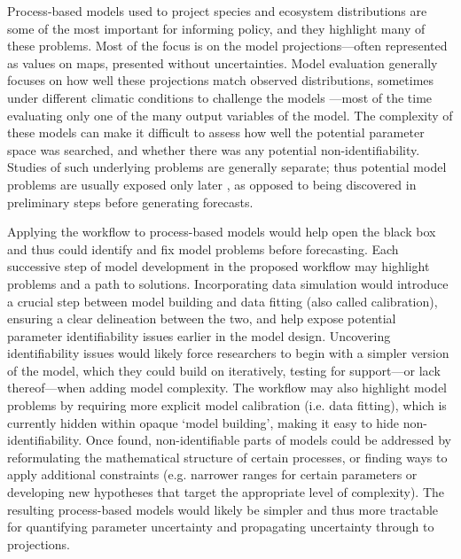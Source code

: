 \documentclass[11pt]{article}
\begin{document}
Process-based models used to project species and ecosystem distributions are some of the most important for informing policy, and they highlight many of these problems. Most of the focus is on the model projections---often represented as values on maps, presented without uncertainties. Model evaluation generally focuses on how well these projections match observed distributions, sometimes under different climatic conditions to challenge the models \citep{VanderMeersch2025a}---most of the time evaluating only one of the many output variables of the model.
The complexity of these models can make it difficult to assess how well the potential parameter space was searched, and whether there was any potential non-identifiability. Studies of such underlying problems are generally separate; thus potential model problems are usually exposed only later \citep{VanderMeersch2025b}, as opposed to being discovered in preliminary steps before generating forecasts. 

Applying the workflow to process-based models would help open the black box and thus could identify and fix model problems before forecasting.
Each successive step of model development in the proposed workflow may highlight problems and a path to solutions. Incorporating data simulation would introduce a crucial step between model building and data fitting (also called calibration), ensuring a clear delineation between the two, and help expose potential parameter identifiability issues earlier in the model design. 
Uncovering identifiability issues would likely force researchers to begin with a simpler version of the model, which they could build on iteratively, testing for support---or lack thereof---when adding model complexity. The workflow may also highlight model problems by requiring more explicit model calibration (i.e. data fitting), which is currently hidden within opaque `model building', making it easy to hide non-identifiability. Once found, non-identifiable parts of models could be addressed by reformulating the mathematical structure of certain processes, or finding ways to apply additional constraints (e.g. narrower ranges for certain parameters or developing new hypotheses that target the appropriate level of complexity). The resulting process-based models would likely be simpler and thus more tractable for quantifying parameter uncertainty and propagating uncertainty through to projections. 
\end{document}
